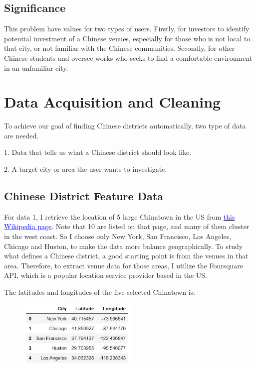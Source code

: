 \documentclass{article}
\begin{document}
\subsection{Significance}
This problem have values for two types of users. Firstly, for investors to identify potential investment of a Chinese venues, especially for those who is not local to that city, or not familiar with the Chinese communities. Secondly, for other Chinese students and oversee works who seeks to find a comfortable environment in an unfamiliar city.

\section{Data Acquisition and Cleaning}
To achieve our goal of finding Chinese districts automatically, two type of data are needed.

1. Data that tells us what a Chinese district should look like.

2. A target city or area the user wants to investigate.

\subsection{Chinese District Feature Data}

For data 1, I retrieve the location of 5 large Chinatown in the US from \href{https://en.wikipedia.org/wiki/Chinatowns_in_the_United_States}{\textcolor{blue}{this Wikipedia page}}. 
Note that 10 are listed on that page, and many of them cluster in the west coast. So I choose only New York, San Francisco, Los Angeles, Chicago and Huston, to make the data more balance geographically.
To study what defines a Chinese district, a good starting point is from the venues in that area.
Therefore, to extract venue data for those areas, I utilize the Foursquare API, which is a popular location service provider based in the US.\cite{foursquare}

The latitudes and longitudes of the five selected Chinatown is:
\begin{figure}[h]
\includegraphics[width=0.5\textwidth]{c1.jpg}
\centering
\end{figure}
\end{document}
